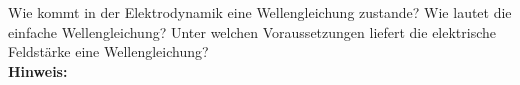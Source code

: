 \begin{question}[section=5,subsection=51,name={Wellengleichung},difficulty=8,type=mdl,tags={}]
	Wie kommt in der Elektrodynamik eine Wellengleichung zustande? Wie lautet die einfache Wellengleichung? Unter welchen Voraussetzungen liefert die elektrische Feldstärke eine Wellengleichung?
	\\ \textbf{Hinweis:}\\
	
\end{question}
\begin{solution}
	
\end{solution}